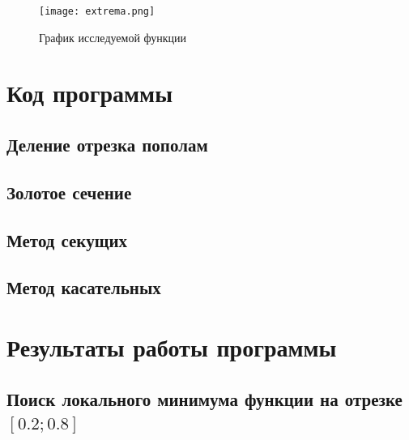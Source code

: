 \documentclass[a4paper,12pt]{extarticle}
\begin{document}
    \begin{figure}[h!]
        \centering
        \texttt{[image: extrema.png]}
        \caption{График исследуемой функции}
    \end{figure}

    \newpage
    \section{Код программы}

    \subsection{Деление отрезка пополам}

    \newpage
    \subsection{Золотое сечение}

    \newpage
    \subsection{Метод секущих}

    \newpage
    \subsection{Метод касательных}

    \newpage
    \section{Результаты работы программы}

    \subsection{Поиск локального минимума функции на отрезке $[0.2; 0.8]$}
\end{document}
